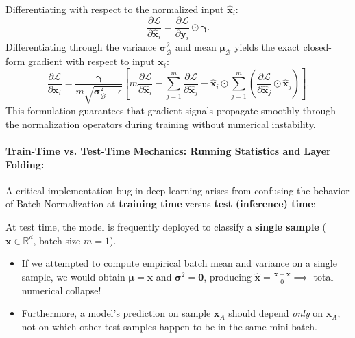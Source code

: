 Differentiating with respect to the normalized input $\hat{\mathbf{x}}_i$:
\begin{equation}
\frac{\partial \mathcal{L}}{\partial \hat{\mathbf{x}}_i} = \frac{\partial \mathcal{L}}{\partial \mathbf{y}_i} \odot \boldsymbol{\gamma}.
\end{equation}
Differentiating through the variance $\boldsymbol{\sigma}_{\mathcal{B}}^2$ and mean $\boldsymbol{\mu}_{\mathcal{B}}$ yields the exact closed-form gradient with respect to input $\mathbf{x}_i$:
\begin{equation}
\frac{\partial \mathcal{L}}{\partial \mathbf{x}_i} = \frac{\boldsymbol{\gamma}}{m \sqrt{\boldsymbol{\sigma}_{\mathcal{B}}^2 + \epsilon}} \left[ m \frac{\partial \mathcal{L}}{\partial \hat{\mathbf{x}}_i} - \sum_{j=1}^m \frac{\partial \mathcal{L}}{\partial \hat{\mathbf{x}}_j} - \hat{\mathbf{x}}_i \odot \sum_{j=1}^m \left( \frac{\partial \mathcal{L}}{\partial \hat{\mathbf{x}}_j} \odot \hat{\mathbf{x}}_j \right) \right].
\label{eq:bn_full_input_grad}
\end{equation}
This formulation guarantees that gradient signals propagate smoothly through the normalization operators during training without numerical instability.

\paragraph{Train-Time vs. Test-Time Mechanics: Running Statistics and Layer Folding:}
A critical implementation bug in deep learning arises from confusing the behavior of Batch Normalization at \textbf{training time} versus \textbf{test (inference) time}:

\begin{examinsight}
At test time, the model is frequently deployed to classify a \textbf{single sample} ($\mathbf{x} \in \mathbb{R}^d$, batch size $m = 1$). 
\begin{itemize}[noitemsep,topsep=2pt,parsep=0pt,partopsep=0pt]
  \item If we attempted to compute empirical batch mean and variance on a single sample, we would obtain $\boldsymbol{\mu} = \mathbf{x}$ and $\boldsymbol{\sigma}^2 = \mathbf{0}$, producing $\hat{\mathbf{x}} = \frac{\mathbf{x} - \mathbf{x}}{0} \implies$ total numerical collapse!
  \item Furthermore, a model's prediction on sample $\mathbf{x}_A$ should depend \textit{only} on $\mathbf{x}_A$, not on which other test samples happen to be in the same mini-batch.
\end{itemize}
\end{examinsight}

